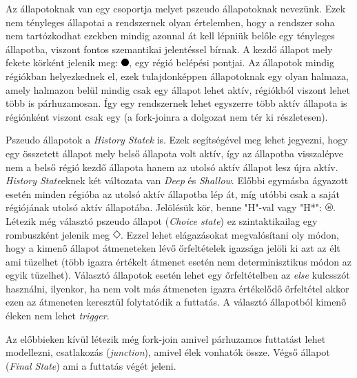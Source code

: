 Az állapotoknak van egy csoportja melyet pszeudo állapotoknak nevezünk. Ezek nem tényleges állapotai a rendszernek olyan értelemben, hogy a rendszer soha nem tartózkodhat ezekben mindig azonnal át kell lépniük belőle egy tényleges állapotba, viszont fontos szemantikai jelentéssel bírnak. A kezdő állapot mely fekete körként jelenik meg: \includegraphics[width=3mm, height=3mm]{figures/preliminaries/icons/initial.png}, egy régió belépési pontjai. Az állapotok mindig régiókban helyezkednek el, ezek tulajdonképpen állapotoknak egy olyan halmaza, amely halmazon belül mindig csak egy állapot lehet aktív, régiókból viszont lehet több is párhuzamosan. Így egy rendszernek lehet egyszerre több aktív állapota is régiónként viszont csak egy (a fork-joinra a dolgozat nem tér ki részletesen).

Pszeudo állapotok a \emph{History Statek} is. Ezek segítségével meg lehet jegyezni, hogy egy összetett állapot mely belső állapota volt aktív, így az állapotba visszalépve nem a belső régió kezdő állapota hanem az utolsó aktív állapot lesz újra aktív. \emph{History State}eknek két változata van \emph{Deep} és \emph{Shallow}. Előbbi egymásba ágyazott esetén minden régióba az utolsó aktív állapotba lép át, míg utóbbi csak a saját régiójának utolsó aktív állapotába. Jelölésük kör, benne "H"-val vagy "H*": \includegraphics[width=3mm, height=3mm]{figures/preliminaries/icons/history.png}. Létezik még választó pszeudo állapot (\emph{Choice state}) ez szintaktikailag egy rombuszként jelenik meg \includegraphics[width=3mm, height=3mm]{figures/preliminaries/icons/choice.png}. Ezzel lehet elágazásokat megvalósítani oly módon, hogy a kimenő állapot átmeneteken lévő őrfeltételek igazsága jelöli ki azt az élt ami tüzelhet (több igazra értékelt átmenet esetén nem determinisztikus módon az egyik tüzelhet). Választó állapotok esetén lehet egy őrfeltételben az \emph{else} kulcsszót használni, ilyenkor, ha nem volt más átmeneten igazra értékelődő őrfeltétel akkor ezen az átmeneten keresztül folytatódik a futtatás. A választó állapotból kimenő éleken nem lehet \emph{trigger}.

Az előbbieken kívül létezik még fork-join amivel párhuzamos futtatást lehet modellezni, csatlakozás (\emph{junction}), amivel élek vonhatók össze. Végső állapot (\emph{Final State}) ami a futtatás végét jeleni.


